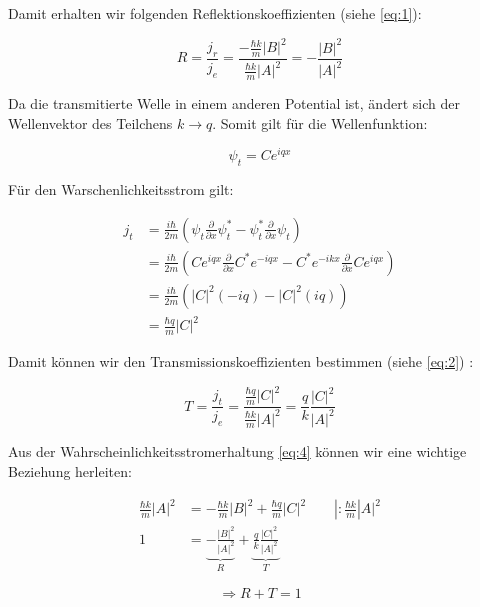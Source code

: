 Damit erhalten wir folgenden Reflektionskoeffizienten (siehe \eqref{eq:1}):

\begin{equation}
  \label{eq:9}
  R = \frac{j_r}{j_e} = \frac{-\frac{\hbar k}{m}|B|^2 }{\frac{\hbar k}{m}|A|^2} = -\frac{|B|^2}{|A|^2}
\end{equation}


Da die transmitierte Welle in einem anderen Potential ist, ändert sich der Wellenvektor des Teilchens \(k \rightarrow q\). Somit gilt für die Wellenfunktion:

\begin{equation}
  \label{eq:10}
    \psi_t = Ce^{iqx}
\end{equation}

Für den Warschenlichkeitsstrom gilt:

\begin{align}
  \label{eq:11}
  j_t &= \frac{i\hbar}{2m}\left(\psi_t \frac{\partial}{\partial x} \psi^*_t - \psi^*_t \frac{\partial}{\partial x}\psi_t\right)\\
&= \frac{i\hbar}{2m}\left(Ce^{iqx} \frac{\partial}{\partial x} C^*e^{-iqx} - C^*e^{-ikx}\frac{\partial}{\partial x}Ce^{iqx}\right)\\
&= \frac{i\hbar}{2m}\left(|C|^2(-iq)  -|C|^2(iq)\right)\\
&= \frac{\hbar q}{m}|C|^2
\end{align}


Damit können wir den Transmissionskoeffizienten bestimmen (siehe \eqref{eq:2}) :


\begin{equation}
  \label{eq:12}
  T = \frac{j_t}{j_e} = \frac{\frac{\hbar q}{m}|C|^2 }{\frac{\hbar k}{m}|A|^2} = \frac{q}{k} \frac{|C|^2}{|A|^2}
\end{equation}

Aus der Wahrscheinlichkeitsstromerhaltung \eqref{eq:4}   können wir eine wichtige Beziehung herleiten:

\begin{align}
  \label{eq:13}
  \frac{\hbar k}{m} |A|^2 &= -\frac{\hbar k}{m}|B|^2 + \frac{\hbar q}{m} |C|^2 \qquad |:\frac{\hbar k}{m}|A|^2 \\
1 &= \underbrace{-\frac{ |B|^2}{|A|^2}}_{R} +\underbrace{ \frac{q}{k} \frac{|C|^2}{|A|^2}}_{T}
\end{align}

\begin{equation}
  \label{eq:14}
  \Rightarrow \boxed{ R+T=1 }
\end{equation}




